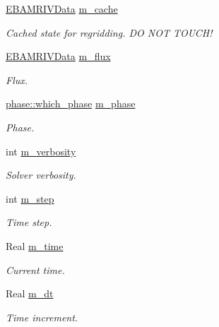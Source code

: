 \begin{DoxyCompactItemize}
\hyperlink{type__definitions_8H_a6b8fa905d55cbb491b52180386f0e0c1}{E\+B\+A\+M\+R\+I\+V\+Data} \hyperlink{classsigma__solver_a3545d970d92cc5f7ccb7b17e1955676f}{m\+\_\+cache}
\begin{DoxyCompactList}\small\item\em Cached state for regridding. DO N\+OT T\+O\+U\+C\+H! \end{DoxyCompactList}\item 
\hyperlink{type__definitions_8H_a6b8fa905d55cbb491b52180386f0e0c1}{E\+B\+A\+M\+R\+I\+V\+Data} \hyperlink{classsigma__solver_ac3e3e032fdac9877851a3c73a7598f02}{m\+\_\+flux}
\begin{DoxyCompactList}\small\item\em Flux. \end{DoxyCompactList}\item 
\hyperlink{namespacephase_a23c76f548a5eb1955ed8c929c541108b}{phase\+::which\+\_\+phase} \hyperlink{classsigma__solver_aafabe1cc6672de0c765671f3ce43a407}{m\+\_\+phase}
\begin{DoxyCompactList}\small\item\em Phase. \end{DoxyCompactList}\item 
int \hyperlink{classsigma__solver_a74df5cbca9b971faac0750553c0f669f}{m\+\_\+verbosity}
\begin{DoxyCompactList}\small\item\em Solver verbosity. \end{DoxyCompactList}\item 
int \hyperlink{classsigma__solver_a978ed53b9a12d3bc4208571a1188739e}{m\+\_\+step}
\begin{DoxyCompactList}\small\item\em Time step. \end{DoxyCompactList}\item 
Real \hyperlink{classsigma__solver_af19bc850b8006af7a7b4533dc267953d}{m\+\_\+time}
\begin{DoxyCompactList}\small\item\em Current time. \end{DoxyCompactList}\item 
Real \hyperlink{classsigma__solver_a18b481ad7d342e4a846563e7a8eace53}{m\+\_\+dt}
\begin{DoxyCompactList}\small\item\em Time increment. \end{DoxyCompactList}\end{DoxyCompactItemize}


